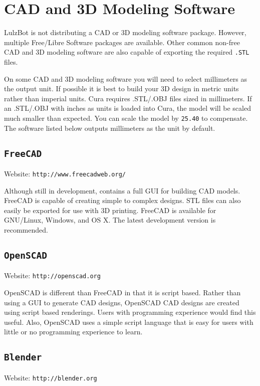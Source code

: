 \section{CAD and 3D Modeling Software}

LulzBot is not distributing a CAD or 3D modeling software package. However, multiple Free/Libre Software packages are available. Other common non-free CAD and 3D modeling software are also capable of exporting the required \texttt{.STL} files.

On some CAD and 3D modeling software you will need to select millimeters as the output unit. If possible it is best to build your 3D design in metric units rather than imperial units. Cura requires .STL/.OBJ files sized in millimeters. If an .STL/.OBJ with inches as units is loaded into Cura, the model will be scaled much smaller than expected. You can scale the model by \texttt{25.40} to compensate. The software listed below outputs millimeters as the unit by default.

\subsection{\texttt{FreeCAD}}
Website: \texttt{http://www.freecadweb.org/}

Although still in development, contains a full GUI for building CAD models. FreeCAD is capable of creating simple to complex designs. STL files can also easily be exported for use with 3D printing. FreeCAD is available for GNU/Linux, Windows, and OS X. The latest development version is recommended.

\subsection{\texttt{OpenSCAD}}
Website: \texttt{http://openscad.org}

OpenSCAD is different than FreeCAD in that it is script based. Rather than using a GUI to generate CAD designs, OpenSCAD CAD designs are created using script based renderings. Users with programming experience would find this useful. Also, OpenSCAD uses a simple script language that is easy for users with little or no programming experience to learn.

\subsection{\texttt{Blender}}
Website: \texttt{http://blender.org}

